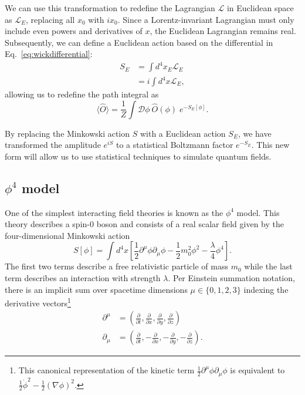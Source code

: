 We can use this transformation to redefine the Lagrangian $\mathcal{L}$ in Euclidean space as $\mathcal{L}_E$, replacing all $x_0$ with $ix_0$. Since a Lorentz-invariant Lagrangian must only include even powers and derivatives of $x$, the Euclidean Lagrangian remains real. Subsequently, we can define a Euclidean action based on the differential in Eq.~\ref{eq:wickdifferential}:
\begin{align}
    S_E &= \int d^4x_E \mathcal{L}_E \\
    &= i \int d^4x \mathcal{L}_E,
\end{align}
allowing us to redefine the path integral as 
\begin{equation}
    \label{eq:pathintegraleuclidean}
    \langle \hat O \rangle = \frac{1}{Z} \int \mathcal{D}\phi \: \hat O (\phi)\; e^{-S_E[\phi]}.
\end{equation}

By replacing the Minkowski action $S$ with a Euclidean action $S_E$, we have transformed the amplitude $e^{iS}$ to a statistical Boltzmann factor $e^{-S_E}$. This new form will allow us to use statistical techniques to simulate quantum fields.

\subsection{$\phi^4$ model}
\label{sec:phi4}

One of the simplest interacting field theories is known as the $\phi^4$ model. This theory describes a spin-0 boson and consists of a real scalar field given by the four-dimensional Minkowski action
\begin{equation}
    \label{eq:phi4 action}
    S[\phi] = \int d^4 x \left[ \frac{1}{2}\partial^\mu \phi \partial_\mu\phi - \frac{1}{2} m_0^2 \phi^2 - \frac{\lambda}{4}\phi^4\right].
\end{equation}
The first two terms describe a free relativistic particle of mass $m_0$ while the last term describes an interaction with strength $\lambda$. Per Einstein summation notation, there is an implicit sum over spacetime dimensions $\mu\in\{0,1,2,3\}$ indexing the derivative vectors\footnote{This canonical representation of the kinetic term $\frac{1}{2}\partial^\mu\phi\partial_\mu\phi$ is equivalent to $\frac{1}{2}\dot\phi^2-\frac{1}{2}\left(\nabla \phi\right)^2$.}
\begin{align}
    \partial^\mu &= \left( \frac{\partial}{\partial t}, \frac{\partial}{\partial x},\frac{\partial}{\partial y}, \frac{\partial}{\partial z} \right) \\
    \partial_\mu &= \left( \frac{\partial}{\partial t}, -\frac{\partial}{\partial x}, -\frac{\partial}{\partial y}, -\frac{\partial}{\partial z} \right).
\end{align}

